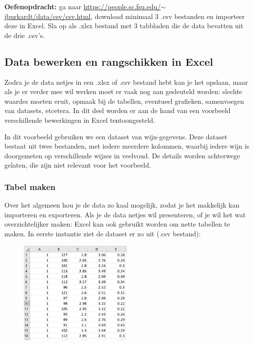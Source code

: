 \color{saxion}\textbf{Oefenopdracht: }\color{black} ga naar \href{https://people.sc.fsu.edu/~jburkardt/data/csv/csv.html}{\textsf{https://people.sc.fsu.edu/$\sim$jburkardt/data/csv/csv.html}}, download minimaal 3 .csv bestanden en importeer deze in Excel. Sla op als .xlsx bestand met 3 tabbladen die de data bevatten uit de drie .csv's.

\subsection{Data bewerken en rangschikken in Excel}
Zodra je de data netjes in een .xlsx of .csv bestand hebt kan je het opslaan, maar als je er verder mee wil werken moet er vaak nog aan gesleuteld worden: slechte waardes moeten eruit, opmaak bij de tabellen, eventueel grafieken, samenvoegen van datasets, etcetera. In dit deel worden er aan de hand van een voorbeeld verschillende bewerkingen in Excel tentoongesteld.

In dit voorbeeld gebruiken we een dataset van wijn-gegevens. Deze dataset bestaat uit twee bestanden, met iedere meerdere kolommen, waarbij iedere wijn is doorgemeten op verschillende wijzes in veelvoud. De details worden achterwege gelaten, die zijn niet relevant voor het voorbeeld. 

\subsubsection*{Tabel maken}
Over het algemeen hou je de data zo kaal mogelijk, zodat je het makkelijk kan importeren en exporteren. Als je de data netjes wil presenteren, of je wil het wat overzichtelijker maken: Excel kan ook gebruikt worden om nette tabellen te maken.
In eerste instantie ziet de dataset er zo uit (.csv bestand):

\begin{figure}[h]
\begin{center}
\includegraphics[width=0.5\textwidth]{img/wijn1.png}
\end{center}
\end{figure}

